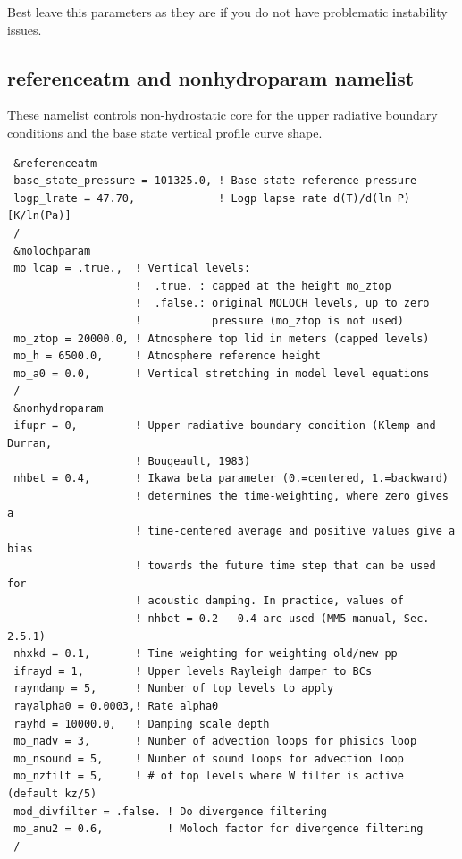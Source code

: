 Best leave this parameters as they are if you do not have problematic
instability issues.

\subsection{referenceatm and nonhydroparam namelist}

These namelist controls non-hydrostatic core for the upper radiative boundary
conditions and the base state vertical profile curve shape.

{\footnotesize
\begin{Verbatim}
 &referenceatm
 base_state_pressure = 101325.0, ! Base state reference pressure
 logp_lrate = 47.70,             ! Logp lapse rate d(T)/d(ln P) [K/ln(Pa)]
 /
 &molochparam
 mo_lcap = .true.,  ! Vertical levels:
                    !  .true. : capped at the height mo_ztop
                    !  .false.: original MOLOCH levels, up to zero
                    !           pressure (mo_ztop is not used)
 mo_ztop = 20000.0, ! Atmosphere top lid in meters (capped levels)
 mo_h = 6500.0,     ! Atmosphere reference height
 mo_a0 = 0.0,       ! Vertical stretching in model level equations
 /
 &nonhydroparam
 ifupr = 0,         ! Upper radiative boundary condition (Klemp and Durran,
                    ! Bougeault, 1983)
 nhbet = 0.4,       ! Ikawa beta parameter (0.=centered, 1.=backward)
                    ! determines the time-weighting, where zero gives a
                    ! time-centered average and positive values give a bias
                    ! towards the future time step that can be used for
                    ! acoustic damping. In practice, values of
                    ! nhbet = 0.2 - 0.4 are used (MM5 manual, Sec. 2.5.1)
 nhxkd = 0.1,       ! Time weighting for weighting old/new pp
 ifrayd = 1,        ! Upper levels Rayleigh damper to BCs
 rayndamp = 5,      ! Number of top levels to apply
 rayalpha0 = 0.0003,! Rate alpha0
 rayhd = 10000.0,   ! Damping scale depth
 mo_nadv = 3,       ! Number of advection loops for phisics loop
 mo_nsound = 5,     ! Number of sound loops for advection loop
 mo_nzfilt = 5,     ! # of top levels where W filter is active (default kz/5)
 mod_divfilter = .false. ! Do divergence filtering
 mo_anu2 = 0.6,          ! Moloch factor for divergence filtering
 /
\end{Verbatim}
}

